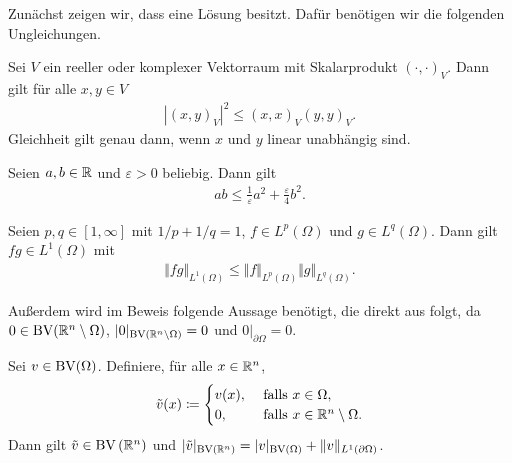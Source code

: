 Zunächst zeigen wir, dass  eine Lösung besitzt.
Dafür benötigen wir die folgenden Ungleichungen.

\begin{lemma}
  \label{lem:csu}
  Sei $V$ ein reeller oder komplexer Vektorraum mit Skalarprodukt
  $(\cdot,\cdot)_V$. Dann gilt für alle $x,y\in V$
  \begin{align*}
    |(x,y)_V|^2\leq (x,x)_V (y,y)_V.
  \end{align*}
  Gleichheit gilt genau dann, wenn $x$ und $y$ linear unabhängig sind.
\end{lemma}

\begin{lemma}
  \label{lem:young}
  Seien $a,b\in\mathbb{R}$ und $\varepsilon>0$ beliebig. Dann gilt
  \begin{align*}
    ab\leq\frac{1}{\varepsilon}a^2+\frac{\varepsilon}{4}b^2. 
  \end{align*}
\end{lemma}

\begin{lemma}
  \label{lem:hoelder}
  Seien $p,q\in [1,\infty]$ mit $1/p+1/q=1$, $f\in L^p(\Omega)$ und 
  $g\in L^q(\Omega)$. Dann gilt $fg\in L^1(\Omega)$ mit 
  \begin{align*}
    \Vert fg\Vert_{L^1(\Omega)}\leq 
    \Vert f\Vert_{L^p(\Omega)}\Vert g\Vert_{L^q(\Omega)}.
  \end{align*}
\end{lemma}



Außerdem wird im Beweis folgende Aussage benötigt, die direkt aus \cite[S. 183,
Theorem 1]{EG92} folgt, da $0\in\textup{BV}(\mathbb{R}^n\setminus\Omega)$,
$|0|_{\textup{BV}(\mathbb{R}^n\setminus\Omega)}=0$ und $0|_{\partial\Omega}=0$.

\begin{lemma}
  \label{lem:bvExtension}
  Sei $v\in\textup{BV}(\Omega)$.
  Definiere, für alle $x\in\mathbb{R}^n$,
  \begin{align*}
    \tilde{v}(x)\coloneqq
    \begin{cases}
      v(x),  &\text{ falls } x\in\Omega,\\
      0,     &\text{ falls } x\in\mathbb{R}^n\setminus\Omega.
    \end{cases} 
  \end{align*}
  Dann gilt $\tilde{v}\in\textup{BV}\left(\mathbb{R}^n\right)$ und
  $|\tilde{v}|_{\textup{BV}\left(\mathbb{R}^n\right)}
  = |v|_{\textup{BV}(\Omega)}+\Vert v\Vert_{L^1(\partial\Omega)}$.
\end{lemma}


